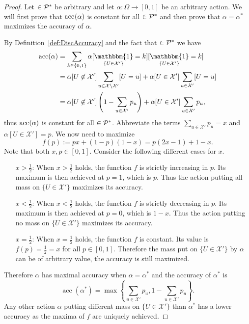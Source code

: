 \documentclass[a4paper]{report}
\theoremstyle{plain}
\theoremstyle{definition}
\theoremstyle{remark}
\numberwithin{equation}{chapter}
\let\P\relax
\DeclareMathOperator{\P}{\mathbb{P}}
\DeclareMathOperator{\1}{\mathbbm{1}}
\newcommand{\X}{\mathcal{X}}
\DeclareMathOperator{\acc}{acc}
\newcommand{\Pmod}{\mathcal{P}^*}
\newcommand{\GeneralGenInd}{\1_{\{U\in\X'\}}}
\begin{document}
\begin{proof}
Let $\P\in\Pmod$ be arbitrary and let $\alpha\colon\Omega\to[0,1]$ be an arbitrary action. We will first prove that $\acc^{\P}(\alpha)$ is constant for all $\P\in\Pmod$ and then prove that $\alpha=\alpha^*$ maximizes the accuracy of $\alpha$.

By Definition~\ref{def:DiscAccuracy} and the fact that $\P\in\Pmod$ we have
\begin{align}
\acc_{\P}(\alpha)&=\sum_{k\in\{0,1\}}\alpha[\GeneralGenInd=k]\P[\GeneralGenInd=k]\\
&=\alpha[U\not\in\X']\sum_{u\in\X\setminus\X'}\P[U=u]+\alpha[U\in\X']\sum_{u\in\X'}\P[U=u]\\
&=\alpha[U\not\in\X']\left(1-\sum_{u\in\X'}p_u\right)+\alpha[U\in\X']\sum_{u\in\X'}p_u,
\end{align}
thus $\acc^{\P}(\alpha)$ is constant for all $\P\in\Pmod$. Abbreviate the terms $\sum_{u\in\X'}p_u=x$ and $\alpha[U\in\X']=p$. We now need to maximize
\begin{equation}
f(p):=px+(1-p)(1-x)=p(2x-1)+1-x.
\end{equation}
Note that both $x,p\in[0,1]$. Consider the following different cases for $x$.
\begin{itemize}
    \item[$x>\frac{1}{2}$:] When $x>\frac{1}{2}$ holds, the function $f$ is strictly increasing in $p$. Its maximum is then achieved at $p=1$, which is $p$. Thus the action putting all mass on $\{U\in\X'\}$ maximizes its accuracy.
    \item[$x<\frac{1}{2}$:] When $x<\frac{1}{2}$ holds, the function $f$ is strictly decreasing in $p$. Its maximum is then achieved at $p=0$, which is $1-x$. Thus the action putting no mass on $\{U\in\X'\}$ maximizes its accuracy.
    \item[$x=\frac{1}{2}$:] When $x=\frac{1}{2}$ holds, the function $f$ is constant. Its value is $f(p)=\frac{1}{2}=x$ for all $p\in[0,1]$. Therefore the mass put on $\{U\in\X'\}$ by $\alpha$ can be of arbitrary value, the accuracy is still maximized.
\end{itemize}
Therefore $\alpha$ has maximal accuracy when $\alpha=\alpha^*$ and the accuracy of $\alpha^*$ is
\begin{equation}
\acc\left(\alpha^*\right)=\max\left\{\sum_{u\in\X'}p_u,1-\sum_{u\in\X'}p_u\right\}.
\end{equation}
Any other action $\alpha$ putting different mass on $\{U\in\X'\}$ than $\alpha^*$ has a lower accuracy as the maxima of $f$ are uniquely achieved.
\end{proof}
\end{document}
